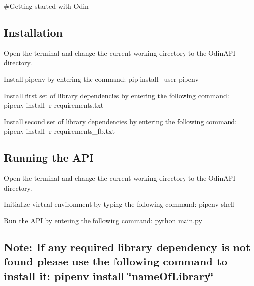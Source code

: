\#\+Getting started with Odin

\subsection*{Installation}


\begin{DoxyEnumerate}
\item Open the terminal and change the current working directory to the Odin\+A\+PI directory.
\item Install pipenv by entering the command\+: pip install --user pipenv
\item Install first set of library dependencies by entering the following command\+: pipenv install -\/r requirements.\+txt
\item Install second set of library dependencies by entering the following command\+: pipenv install -\/r requirements\+\_\+fb.\+txt
\end{DoxyEnumerate}

\subsection*{Running the A\+PI}


\begin{DoxyEnumerate}
\item Open the terminal and change the current working directory to the Odin\+A\+PI directory.
\item Initialize virtual environment by typing the following command\+: pipenv shell
\item Run the A\+PI by entering the following command\+: python main.\+py
\end{DoxyEnumerate}

\subsection*{Note\+: If any required library dependency is not found please use the following command to install it\+: pipenv install \char`\"{}name\+Of\+Library\char`\"{}}